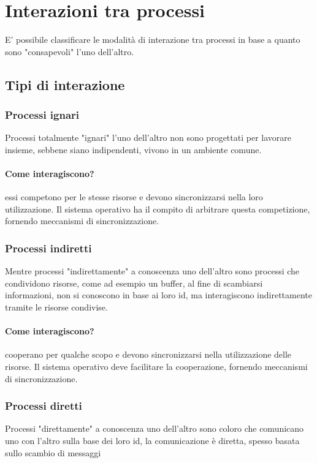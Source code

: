 \section{Interazioni tra processi}

E' possibile classificare le modalità di interazione tra processi
in base a quanto sono "consapevoli" l’uno dell'altro.


\subsection{Tipi di interazione}
\subsubsection{Processi ignari}
Processi totalmente "ignari" l’uno dell'altro non sono progettati per lavorare insieme, sebbene siano indipendenti, vivono in un ambiente comune.
\paragraph{Come interagiscono?} essi competono per le stesse risorse e devono sincronizzarsi nella loro utilizzazione. Il sistema operativo ha il compito di arbitrare questa competizione, fornendo meccanismi di sincronizzazione.

\subsubsection{Processi indiretti}
Mentre processi "indirettamente" a conoscenza uno dell'altro
sono processi che condividono risorse, come ad esempio un buffer, al fine di scambiarsi informazioni, non si conoscono in base ai loro id, ma interagiscono indirettamente tramite le risorse condivise.
\paragraph{Come interagiscono?} cooperano per qualche scopo e devono sincronizzarsi nella utilizzazione delle risorse. Il sistema operativo deve facilitare la cooperazione, fornendo meccanismi di sincronizzazione.

\subsubsection{Processi diretti}
Processi "direttamente" a conoscenza uno dell'altro sono coloro che comunicano uno con l'altro sulla base dei loro id, la comunicazione è diretta, spesso basata sullo scambio di messaggi
